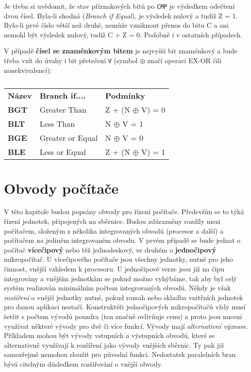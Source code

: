       Je třeba si uvědomit, že stav příznakových bitů po \texttt{CMP} je výsledkem odečtení dvou 
      čísel. Byla-li shodná (\emph{Branch if Equal}), je výsledek nulový a tudíž Z = 1. Bylo-li 
      prvé číslo větší než druhé, nemůže vzniknout přenos do bitu C a ani nemohl být výsledek 
      nulový, tudíž C + Z = 0. Podobně i v ostatních případech.
      
      V případě \textbf{čísel se znaménkovým bitem} je nejvyšší bit znaménkový a bude třeba vzít do 
      úvahy i bit přetečení \texttt{V} (symbol \(\oplus\) značí operaci EX-OR čili nonekvivalenci):
      
      \begin{table}[ht!]
        \begin{tabular*}{0.75\textwidth}{lll}
         \textbf{Název} & \textbf{Branch if....}  & \textbf{Podmínky}   \\ \cline{1-3}
         \textbf{BGT}   & Greater Than     & Z + (N \(\oplus\) V) = 0       \\
         \textbf{BLT}   & Less Than        & N \(\oplus\) V = 1       \\
         \textbf{BGE}   & Greater or Equal & N \(\oplus\) V = 0   \\
         \textbf{BLE}   & Less or Equal    & Z + (N \(\oplus\) V) = 1       \\
        \end{tabular*}
        \caption*{ }
      \end{table}

  \section{Obvody počítače}\label{ces:IchapIVsecIII}
    V této kapitole budou popsány obvody pro řízení počítače. Především se to týká řízení jednotek, 
    připojených na sběrnice. Budou zdůrazněny rozdíly mezi počítačem, složeným z několika 
    integrovaných obvodů (procesor a další) a počítačem na jediném integrovaném obvodu. V prvém 
    případě se bude jednat o počítač \textbf{vícečipový} nebo též jednodeskový, ve druhém o 
    \textbf{jednočipový} mikropočítač. U vícečipového počítače jsou všechny jednotky, nutné pro 
    jeho činnost, vnější vzhledem k procesoru. U jednočipové verze jsou již na čipu integrovány a 
    vnějším jednotkám se pokud možno vyhýbáme, tak aby byl celý systém realizován minimálním počtem 
    integrovaných obvodů. Někdy je však \emph{rozšíření} o vnější jednotky nutné, pokud rozsah nebo 
    skladba vnitřních jednotek pro danou aplikaci nestačí. Konstruktéři jednočipových mikropočítačů 
    vždy musí šetřit s počtem vývodů pouzdra (ten značně ovlivňuje cenu) a proto jsou nuceni 
    využívat některé vývody pro dvě či více funkcí. Vývody mají \emph{alternativní význam}. 
    Příkladem mohou být vývody vstupních a výstupních obvodů, které se alternativně využívají k 
    rozšíření jako vývody vnějších sběrnic. Ty pak již samozřejmě nemohou sloužit pro původní 
    funkci. Nedostatek paralelních bran bývá citelným důsledkem rozšiřování o vnější obvody.
    
